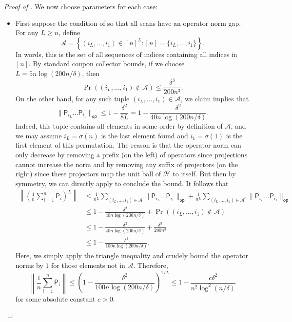 \documentclass[11pt]{article}
\begin{document}
\begin{proof}[Proof of ]
    We now choose parameters for each case:
    \begin{itemize}
        \item First suppose the condition of  so that all scans have an operator norm gap. For any $L\geq n$, define 
        \begin{equation*}
            \mathcal{A} =\left\{(i_L,\ldots,i_1)\in [n]^L: [n] = \{i_L,\ldots,i_1\}\right\}.
        \end{equation*}
        In words, this is the set of all sequences of indices containing all indices in $[n]$. By standard coupon collector bounds, if we choose $L=5n \log(200n/\delta)$, then
        \begin{equation*}
            \Pr((i_L,\ldots,i_1)\not\in \mathcal{A})\leq \frac{\delta^{3}}{200n^{3}}.
        \end{equation*}
        On the other hand, for any such tuple $(i_L,\ldots,i_1)\in \mathcal{A}$, we claim
         implies that
        \begin{equation*}
            \|\mathsf{P}_{i_L}\ldots \mathsf{P}_{i_1}\|_{\mathsf{op}}\leq 1-\frac{\delta^2}{8L}=1-\frac{\delta^2}{40n\log(200n/\delta)}.
        \end{equation*}
        Indeed, this tuple contains all elements in some order by definition of $\mathcal{A}$, and we may assume $i_L=\sigma(n)$ is the last element found and $i_1=\sigma(1)$ is the first element of this permutation.  The reason is that the operator norm can only decrease by removing a prefix (on the left) of operators since projections cannot increase the norm and by removing any suffix of projectors (on the right) since these projectors map the unit ball of $\mathcal{H}$ to itself. But then by symmetry, we can directly apply  to conclude the bound. It follows that
        \begin{align*}
            \left\|\left(\frac{1}{n}\sum_{i=1}^n \mathsf{P}_i\right)^L\right\|&\leq \frac{1}{n^L}\sum_{(i_L,\ldots,i_1)\in \mathcal{A}} \|\mathsf{P}_{i_L}\ldots \mathsf{P}_{i_1}\|_{\mathsf{op}}+\frac{1}{n^L}\sum_{(i_L,\ldots,i_1)\in \mathcal{A}^c} \|\mathsf{P}_{i_L}\ldots \mathsf{P}_{i_1}\|_{\mathsf{op}}\\
            &\leq 1-\frac{\delta^2}{40n\log(200n/\delta)}+\Pr((i_L,\ldots,i_1)\not\in \mathcal{A})\\
            &\leq 1-\frac{\delta^2}{40n\log(200n/\delta)}+\frac{\delta^{3}}{200n^3}\\
            &\leq 1-\frac{\delta^2}{100n\log(200n/\delta)}.
        \end{align*}
        Here, we simply apply the triangle inequality and crudely bound the operator norms by $1$ for those elements not in $\mathcal{A}$. Therefore,
        \begin{equation*}
            \left\|\frac{1}{n}\sum_{i=1}^n \mathsf{P}_i\right\|\leq \left(1-\frac{\delta^2}{100n\log(200n/\delta)}\right)^{1/L}\leq 1-\frac{c\delta^2}{n^2\log^2(n/\delta)}
        \end{equation*}
        for some absolute constant $c>0$.


\end{itemize}
\end{proof}
\end{document}
